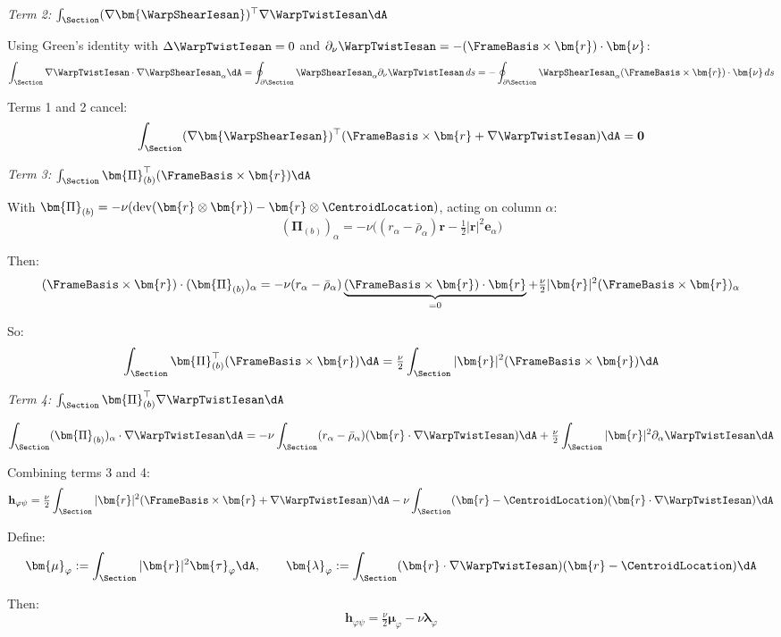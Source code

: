 \emph{Term 2:}
\(\int_\Section (\nabla\bm{\WarpShearIesan})^\top \nabla\WarpTwistIesan \dA\)

Using Green's identity with \(\Delta\WarpTwistIesan = 0\) and
\(\partial_\nu\WarpTwistIesan = -(\FrameBasis \times \bm{r}) \cdot \bm{\nu}\):
\[\int_\Section \nabla\WarpTwistIesan \cdot \nabla\WarpShearIesan_\alpha \dA = \oint_{\partial\Section} \WarpShearIesan_\alpha \partial_\nu\WarpTwistIesan \, ds = -\oint_{\partial\Section} \WarpShearIesan_\alpha (\FrameBasis \times \bm{r}) \cdot \bm{\nu} \, ds\]

Terms 1 and 2 cancel:
\[\int_\Section (\nabla\bm{\WarpShearIesan})^\top (\FrameBasis \times \bm{r} + \nabla\WarpTwistIesan) \dA = \mathbf{0}\]

\emph{Term 3:}
\(\int_\Section \bm{\Pi}_{(b)}^\top (\FrameBasis \times \bm{r}) \dA\)

With
\(\bm{\Pi}_{(b)} = -\nu(\text{dev}(\bm{r} \otimes \bm{r}) - \bm{r} \otimes \CentroidLocation)\),
acting on column \(\alpha\):
\[(\bm{\Pi}_{(b)})_\alpha = -\nu\big((r_\alpha - \bar{\rho}_\alpha)\bm{r} - \tfrac{1}{2}|\bm{r}|^2 \bm{e}_\alpha\big)\]

Then:
\[(\FrameBasis \times \bm{r}) \cdot (\bm{\Pi}_{(b)})_\alpha = -\nu(r_\alpha - \bar{\rho}_\alpha)\underbrace{(\FrameBasis \times \bm{r}) \cdot \bm{r}}_{=0} + \tfrac{\nu}{2}|\bm{r}|^2 (\FrameBasis \times \bm{r})_\alpha\]

So:
\[\int_\Section \bm{\Pi}_{(b)}^\top (\FrameBasis \times \bm{r}) \dA = \tfrac{\nu}{2} \int_\Section |\bm{r}|^2 (\FrameBasis \times \bm{r}) \dA\]

\emph{Term 4:}
\(\int_\Section \bm{\Pi}_{(b)}^\top \nabla\WarpTwistIesan \dA\)

\[\int_\Section (\bm{\Pi}_{(b)})_\alpha \cdot \nabla\WarpTwistIesan \dA = -\nu \int_\Section (r_\alpha - \bar{\rho}_\alpha)(\bm{r} \cdot \nabla\WarpTwistIesan) \dA + \tfrac{\nu}{2} \int_\Section |\bm{r}|^2 \partial_\alpha\WarpTwistIesan \dA\]

Combining terms 3 and 4:
\[\mathbf{h}_{\varphi\psi} = \tfrac{\nu}{2} \int_\Section |\bm{r}|^2 (\FrameBasis \times \bm{r} + \nabla\WarpTwistIesan) \dA - \nu \int_\Section (\bm{r} - \CentroidLocation)(\bm{r} \cdot \nabla\WarpTwistIesan) \dA\]

Define:
\[\bm{\mu}_\varphi := \int_\Section |\bm{r}|^2 \bm{\tau}_\varphi \dA, \qquad \bm{\lambda}_\varphi := \int_\Section (\bm{r} \cdot \nabla\WarpTwistIesan)(\bm{r} - \CentroidLocation) \dA\]

Then:
\[\mathbf{h}_{\varphi\psi} = \tfrac{\nu}{2}\bm{\mu}_\varphi - \nu\bm{\lambda}_\varphi\]

